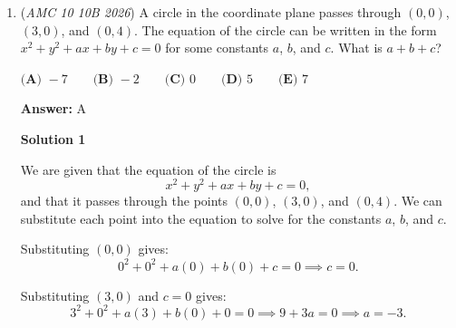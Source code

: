 \begin{enumerate}
The goal is to make the numerator $0$ or the denominator $1$, and find the rest. $3$ makes the denominator 1. $1$ and $-1$ make the numerator 0. After trying a few more numbers, we can find out that $-5$ also works. So there are $\fbox{4}$ numbers

 



\textbf{Solution 8 (Number Theory)}

Factoring the numerator as the difference of squares, we have 
 \[\frac{n^2 - 1}{n+2} = \frac{(n+1)(n-1)}{n+2}.\]

 For this expression to be an integer, $n+2$ must divide $(n+1)(n-1)$. Since any two consecutive integers are relatively prime, $\gcd(n+1, n+2) = 1$, which implies that $n+2$ must divide $n-1$.

 Rewriting the numerator of $\frac{n-1}{n+2}$ in terms of the denominator gives 
 \[\frac{n-1}{n+2} = \frac{(n+2)-3}{n+2} = 1 - \frac{3}{n+2}.\]

 Thus, $\frac{n-1}{n+2}$ is an integer if and only if $n + 2$ is a divisor of $3$. The integer divisors of $3$ are $-3, -1, 1, -3$, yielding $n = -5, -3, -1,$ and $1$, respectively.

 Therefore, there are $\boxed{\textbf{(C) } 4}$ such integers $n$.

 


	\item (\textit{AMC 10 10B 2026}) A circle in the coordinate plane passes through $(0,0)$, $(3,0)$, and $(0,4)$. The equation of the circle can be written in the form $x^2 + y^2 + ax + by + c = 0$ for some constants $a$, $b$, and $c$. What is $a + b + c$?


 $\textbf{(A) } -7 \qquad \textbf{(B) } -2 \qquad \textbf{(C) } 0 \qquad \textbf{(D) } 5 \qquad \textbf{(E) } 7$

 \textbf{Answer: }A



\textbf{Solution 1}

We are given that the equation of the circle is
 \[x^2 + y^2 + ax + by + c = 0,\]and that it passes through the points $(0,0)$, $(3,0)$, and $(0,4)$. We can substitute each point into the equation to solve for the constants $a$, $b$, and $c$.

 Substituting $(0,0)$ gives:
 \[0^2 + 0^2 + a(0) + b(0) + c = 0 \implies c = 0.\]

 Substituting $(3,0)$ and $c = 0$ gives:
 \[3^2 + 0^2 + a(3) + b(0) + 0 = 0 \implies 9 + 3a = 0 \implies a = -3.\]


\end{enumerate}
